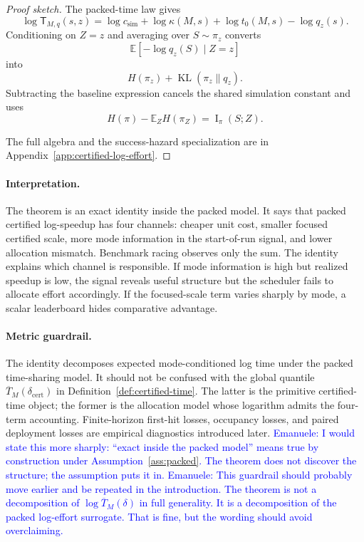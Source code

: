 \documentclass{article}
\DeclareMathOperator{\KL}{KL}
\DeclareMathOperator{\MI}{I}
\newcommand{\E}{\mathbb{E}}
\begin{document}
\begin{proof}[Proof sketch]
The packed-time law gives
\[
    \log \mathsf T_{M,q}(s,z)
    =
    \log c_{\mathrm{sim}}
    +
    \log\kappa(M,s)
    +
    \log t_0(M,s)
    -
    \log q_z(s).
\]
Conditioning on \(Z=z\) and averaging over \(S\sim\pi_z\) converts
\[
    \E[-\log q_z(S)\mid Z=z]
\]
into
\[
    H(\pi_z)+\KL(\pi_z\|q_z).
\]
Subtracting the baseline expression cancels the shared simulation constant and uses
\[
    H(\pi)-\E_ZH(\pi_Z)=\MI_\pi(S;Z).
\]


The full algebra and the success-hazard specialization are in
Appendix~\ref{app:certified-log-effort}.
\end{proof}

\paragraph{Interpretation.}
The theorem is an exact identity inside the packed model.  It says that packed certified
log-speedup has four channels: cheaper unit cost, smaller focused certified scale, more
mode information in the start-of-run signal, and lower allocation mismatch.  Benchmark
racing observes only the sum.  The identity explains which channel is responsible.  If mode
information is high but realized speedup is low, the signal reveals useful structure but the
scheduler fails to allocate effort accordingly.  If the focused-scale term varies sharply by
mode, a scalar leaderboard hides comparative advantage.

\paragraph{Metric guardrail.}
The identity decomposes expected mode-conditioned log time under the packed time-sharing
model.  It should not be confused with the global quantile
\(\overline T_M(\delta_{\mathrm{cert}})\) in Definition~\ref{def:certified-time}.  The latter is the
primitive certified-time object; the former is the allocation model whose logarithm admits
the four-term accounting.  Finite-horizon first-hit losses, occupancy losses, and paired
deployment losses are empirical diagnostics introduced later.
\textcolor{blue}{Emanuele: I would state this more sharply: ``exact inside the packed model'' means true by construction under Assumption~\ref{ass:packed}. The theorem does not discover the structure; the assumption puts it in.}
\textcolor{blue}{Emanuele: This guardrail should probably move earlier and be repeated in the introduction. The theorem is not a decomposition of \(\log\overline T_M(\delta)\) in full generality. It is a decomposition of the packed log-effort surrogate. That is fine, but the wording should avoid overclaiming.}
\end{document}
